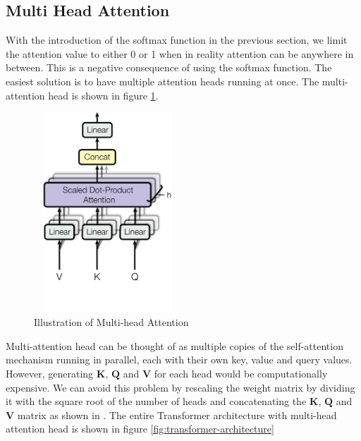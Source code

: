\subsection{Multi Head Attention}

With the introduction of the softmax function in the previous section, we limit the attention value to either 0 or 1 when in reality attention can be anywhere in between. This is a negative consequence of using the softmax function. The easiest solution is to have multiple attention heads running at once. The multi-attention head is shown in figure \ref{fig:multi-head}.

\begin{figure}[ht]
\includegraphics[width=5.5cm, height=7.5cm]{images/multi-head attention.png}
\centering
\caption{Illustration of Multi-head Attention \protect\cite{attention-is-all-you-need}}
\label{fig:multi-head}
\end{figure}
\FloatBarrier

Multi-attention head can be thought of as multiple copies of the self-attention mechanism running in parallel, each with their own key, value and query values. However, generating $\mathbf{K}$, $\mathbf{Q}$ and $\mathbf{V}$ for each head would be computationally expensive. We can avoid this problem by rescaling the weight matrix by dividing it with the square root of the number of heads and concatenating the $\mathbf{K}$, $\mathbf{Q}$ and $\mathbf{V}$ matrix as shown in . The entire Transformer architecture with multi-head attention head is shown in figure \ref{fig:transformer-architecture}

